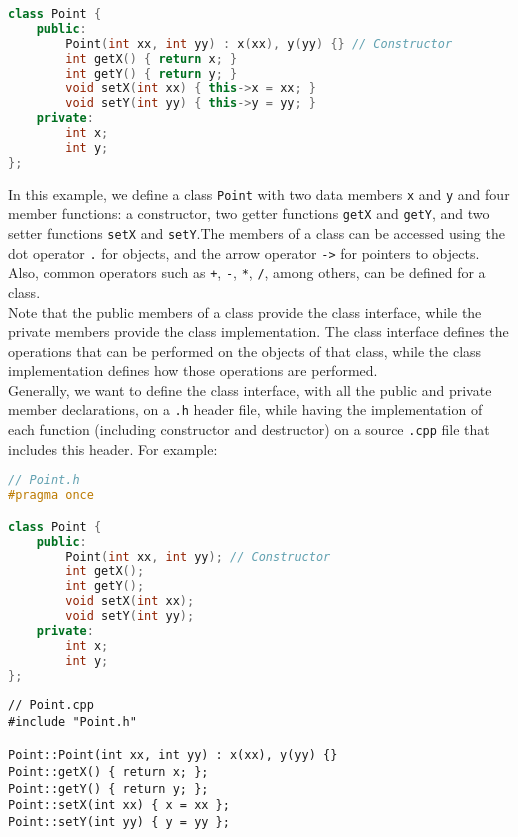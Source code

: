 \begin{lstlisting}[language=C++]
class Point {
    public:
        Point(int xx, int yy) : x(xx), y(yy) {} // Constructor
        int getX() { return x; }
        int getY() { return y; }
        void setX(int xx) { this->x = xx; }
        void setY(int yy) { this->y = yy; }
    private:
        int x;
        int y;
};
\end{lstlisting}

In this example, we define a class \texttt{Point} with two data members \texttt{x}
and \texttt{y} and four member functions: a constructor, two getter functions
\texttt{getX} and \texttt{getY}, and two setter functions \texttt{setX} and
\texttt{setY}.The members of a class can be accessed using the dot operator 
\texttt{.} for objects, and the arrow operator \texttt{->} for pointers to objects. 
Also, common operators such as \texttt{+}, \texttt{-}, \texttt{*}, \texttt{/}, 
among others, can be defined for a class.\\

Note that the public members of a class provide the class interface, while the private
members provide the class implementation. The class interface defines the
operations that can be performed on the objects of that class, while the class
implementation defines how those operations are performed.\\

Generally, we want to define the class interface, with all the public and private
member declarations, on a \texttt{.h} header file, while having the implementation of each 
function (including constructor and destructor) on a source \texttt{.cpp} file that 
includes this header. For example:

\begin{lstlisting}[language=C++]
// Point.h
#pragma once

class Point {
    public:
        Point(int xx, int yy); // Constructor
        int getX();
        int getY();
        void setX(int xx);
        void setY(int yy);
    private:
        int x;
        int y;
};
\end{lstlisting}

\begin{lstlisting}
// Point.cpp
#include "Point.h"

Point::Point(int xx, int yy) : x(xx), y(yy) {}
Point::getX() { return x; };
Point::getY() { return y; };
Point::setX(int xx) { x = xx };
Point::setY(int yy) { y = yy };
\end{lstlisting}

